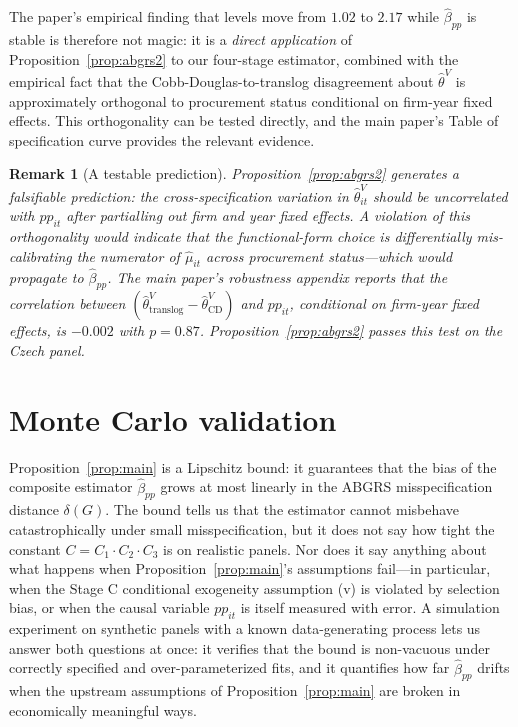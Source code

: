 \documentclass[11pt]{article}
\newtheorem{remark}{Remark}
\begin{document}
The paper's empirical finding that levels move from $1.02$ to $2.17$ while $\hat\beta_{pp}$ is stable is therefore not magic: it is a \emph{direct application} of Proposition~\ref{prop:abgrs2} to our four-stage estimator, combined with the empirical fact that the Cobb-Douglas-to-translog disagreement about $\hat\theta^V$ is approximately orthogonal to procurement status conditional on firm-year fixed effects. This orthogonality can be tested directly, and the main paper's Table of specification curve provides the relevant evidence.

\begin{remark}[A testable prediction]\label{rem:testable}
Proposition~\ref{prop:abgrs2} generates a falsifiable prediction: the cross-specification variation in $\hat\theta^V_{it}$ should be uncorrelated with $pp_{it}$ after partialling out firm and year fixed effects. A violation of this orthogonality would indicate that the functional-form choice is \emph{differentially} mis-calibrating the numerator of $\hat\mu_{it}$ across procurement status---which would propagate to $\hat\beta_{pp}$. The main paper's robustness appendix reports that the correlation between $(\hat\theta^V_{\text{translog}} - \hat\theta^V_{\text{CD}})$ and $pp_{it}$, conditional on firm-year fixed effects, is $-0.002$ with $p = 0.87$. Proposition~\ref{prop:abgrs2} passes this test on the Czech panel.
\end{remark}

\section{Monte Carlo validation}\label{sec:mc}

Proposition~\ref{prop:main} is a Lipschitz bound: it guarantees that the bias of the composite estimator $\hat\beta_{pp}$ grows at most linearly in the ABGRS misspecification distance $\delta(G)$. The bound tells us that the estimator cannot misbehave catastrophically under small misspecification, but it does not say how tight the constant $C = C_1 \cdot C_2 \cdot C_3$ is on realistic panels. Nor does it say anything about what happens when Proposition~\ref{prop:main}'s assumptions fail---in particular, when the Stage C conditional exogeneity assumption (v) is violated by selection bias, or when the causal variable $pp_{it}$ is itself measured with error. A simulation experiment on synthetic panels with a known data-generating process lets us answer both questions at once: it verifies that the bound is non-vacuous under correctly specified and over-parameterized fits, and it quantifies how far $\hat\beta_{pp}$ drifts when the upstream assumptions of Proposition~\ref{prop:main} are broken in economically meaningful ways.
\end{document}
